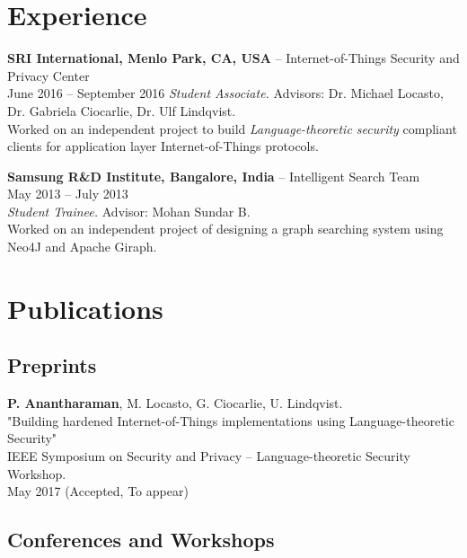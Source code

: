 \documentclass[letterpaper,10pt]{article}
\renewenvironment{itemize}{
  \begin{list}{}{
    \setlength{\leftmargin}{1.5em}
  }
}{
  \end{list}
}
\begin{document}
\section*{Experience}
\begin{itemize}
\setlength\itemsep{0ex}
\item \textbf{SRI International, Menlo Park, CA, USA} -- Internet-of-Things Security and Privacy Center\\
    June 2016 -- September 2016
    \textit{Student Associate.} Advisors: Dr. Michael Locasto, Dr. Gabriela Ciocarlie, Dr. Ulf Lindqvist.\\
    Worked on an independent project to build \textit{Language-theoretic security} compliant clients for application layer Internet-of-Things protocols. 
\item \textbf{Samsung R\&D Institute, Bangalore, India} -- Intelligent Search Team\\
    May 2013 -- July 2013\\
    \textit{Student Trainee.} Advisor: Mohan Sundar B.\\
    Worked on an independent project of designing a graph searching system using Neo4J and Apache Giraph.
\end{itemize}


\section*{Publications}


\subsection*{Preprints}
\begin{itemize}
    \item {\bf P. Anantharaman}, M. Locasto, G. Ciocarlie, U. Lindqvist.\\
        "Building hardened Internet-of-Things implementations using Language-theoretic Security"\\
        IEEE Symposium on Security and Privacy -- Language-theoretic Security Workshop.\\
        May 2017 (Accepted, To appear)
\end{itemize}

\subsection*{Conferences and Workshops} %
\end{document}
